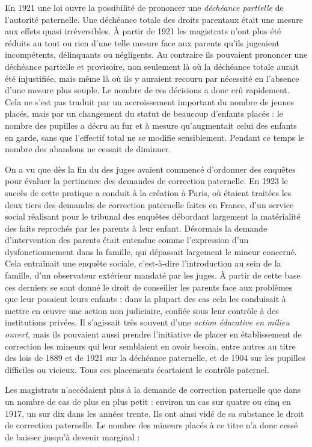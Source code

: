  En 1921 une loi ouvre la possibilité de prononcer une \emph{déchéance partielle} de l'autorité paternelle. Une déchéance totale des droits parentaux était une mesure aux effets quasi irréversibles. À partir de 1921 les magistrats n'ont plus été réduits au tout ou rien d'une telle mesure face aux parents qu'ils jugeaient incompétents, délinquants ou négligents. Au contraire ils pouvaient prononcer une déchéance partielle et provisoire, non seulement là où la déchéance totale aurait été injustifiée, mais même là où ils y auraient recouru par nécessité en l'absence d'une mesure plus souple. Le nombre de ces décisions a donc crû rapidement. Cela ne s'est pas traduit par un accroissement important du nombre de jeunes placés, mais par un changement du statut de beaucoup d'enfants placés : le nombre des pupilles a décru au fur et à mesure qu'augmentait celui des enfants en garde, sans que l'effectif total ne se modifie sensiblement. Pendant ce temps le nombre des abandons ne cessait de diminuer.

 On a vu que dès la fin du  des juges avaient commencé d'ordonner des enquêtes pour évaluer la pertinence des demandes de correction paternelle. En 1923 le succès de cette pratique a conduit à la création à Paris, où étaient traitées les deux tiers des demandes de correction paternelle faites en France, d'un service social réalisant pour le tribunal des enquêtes débordant largement la matérialité des faits reprochés par les parents à leur enfant. Désormais la demande d'intervention des parents était entendue comme l'expression d'un dysfonctionnement dans la famille, qui dépassait largement le mineur concerné. Cela entraînait une enquête sociale, c'est-à-dire l'introduction au sein de la famille, d'un observateur extérieur mandaté par les juges. À partir de cette base ces derniers se sont donné le droit de conseiller les parents face aux problèmes que leur posaient leurs enfants : dans la plupart des cas cela les conduisait à mettre en œuvre une action non judiciaire, confiée sous leur contrôle à des institutions privées. Il s'agissait très souvent d'une \emph{action éducative en milieu ouvert}, mais ils pouvaient aussi prendre l'initiative de placer en établissement de correction les mineurs qui leur semblaient en avoir besoin, entre autres au titre des lois de 1889 et de 1921 sur la déchéance paternelle, et de 1904 sur les pupilles difficiles ou vicieux. Tous ces placements écartaient le contrôle paternel.

 Les magistrats n'accédaient plus à la demande de correction paternelle que dans un nombre de cas de plus en plus petit : environ un cas sur quatre ou cinq en 1917, un sur dix dans les années trente. Ils ont ainsi vidé de sa substance le droit de correction paternelle. Le nombre des mineurs placés à ce titre n'a donc cessé de baisser jusqu'à devenir marginal :
 
